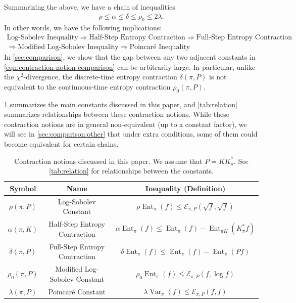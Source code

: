 \documentclass[11pt]{article}
\def\cE{\mathcal{E}}
\DeclareMathOperator\Var{\mathrm{Var}}
\DeclareMathOperator\Ent{\mathrm{Ent}}
\theoremstyle{definition}
\begin{document}
Summarizing the above, we have a chain of inequalities %
\begin{align} \label{eqn:contraction-notion-comparison}
  \rho \le \alpha \le \delta \le \rho_0 \le 2\lambda.
\end{align}
In other words, we have the following implications:
\begin{multline}\label{eqn:words-contraction-notion-comparison}
\text{Log-Sobolev Inequality}
\Longrightarrow
\text{Half-Step Entropy Contraction}
\Longrightarrow
\text{Full-Step Entropy Contraction} \\
\Longrightarrow
\text{Modified Log-Sobolev Inequality}
\Longrightarrow
\text{Poincar\'e Inequality}
\end{multline}
In \cref{sec:comparison}, we show that the gap between any two adjacent constants in \cref{eqn:contraction-notion-comparison} can be arbitrarily large.
In particular, unlike the $\chi^2$-divergence, the discrete-time entropy contraction $\delta(\pi, P)$ is not equivalent to the continuous-time entropy contraction $\rho_0(\pi, P)$.

\cref{tab:const} summarizes the main constants discussed in this paper, and \cref{tab:relation} summarizes relationships between these contraction notions.
While these contraction notions are in general non-equivalent (up to a constant factor), we will see in \cref{sec:comparison:other} that under extra conditions, some of them could become equivalent for certain chains.

\begin{table}[ht]
  \centering
  \begin{tabular}{|c|c|c|}
    \hline
    Symbol & Name  & Inequality (Definition) \\ \hline
    $\rho(\pi, P)$ & Log-Sobolev Constant & $\rho \Ent_\pi(f) \le \cE_{\pi,P}(\sqrt f,\sqrt f)$ \\ \hline
    $\alpha(\pi, K)$ & Half-Step Entropy Contraction & $\alpha \Ent_\pi(f) \le \Ent_\pi(f) - \Ent_{\pi K}(K_\pi^*f)$ \\ \hline
    $\delta(\pi, P)$ & Full-Step Entropy Contraction & $\delta \Ent_\pi(f) \le \Ent_\pi(f)-\Ent_\pi(Pf)$ \\ \hline
    $\rho_0(\pi, P)$ & Modified Log-Sobolev Constant & $\rho_0 \Ent_\pi(f) \le \cE_{\pi,P}(f,\log f)$ \\ \hline
    $\lambda(\pi, P)$ & Poincar\'e Constant & $\lambda \Var_\pi(f) \le \cE_{\pi,P}(f,f)$ \\ \hline
  \end{tabular}
  \caption{Contraction notions discussed in this paper. We assume that $P=KK_\pi^*$. See \cref{tab:relation} for relationships between the constants.}
  \label{tab:const}
\end{table}
\end{document}
